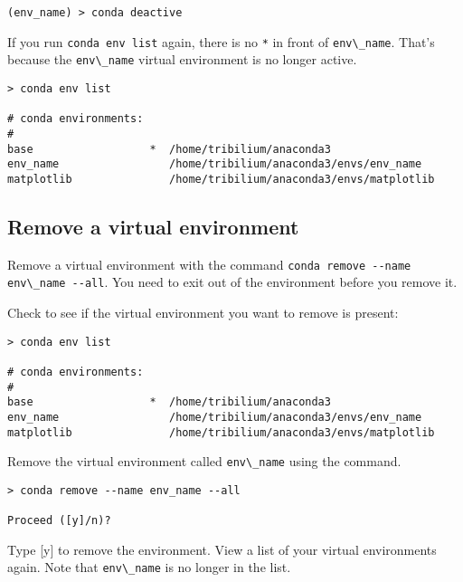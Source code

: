 \documentclass{book}
\newcommand{\passthrough}[1]{#1}
\begin{document}
\begin{lstlisting}
(env_name) > conda deactive
\end{lstlisting}

If you run \passthrough{\lstinline!conda env list!} again, there is no
\passthrough{\lstinline!*!} in front of
\passthrough{\lstinline!env\_name!}. That's because the
\passthrough{\lstinline!env\_name!} virtual environment is no longer
active.

\begin{lstlisting}
> conda env list

# conda environments:
#
base                  *  /home/tribilium/anaconda3
env_name                 /home/tribilium/anaconda3/envs/env_name
matplotlib               /home/tribilium/anaconda3/envs/matplotlib
\end{lstlisting}
    




    
        \hypertarget{remove-a-virtual-environment}{%
\subsection{Remove a virtual
environment}\label{remove-a-virtual-environment}}

Remove a virtual environment with the command
\passthrough{\lstinline!conda remove --name env\_name --all!}. You need
to exit out of the environment before you remove it.

Check to see if the virtual environment you want to remove is present:

\begin{lstlisting}
> conda env list

# conda environments:
#
base                  *  /home/tribilium/anaconda3
env_name                 /home/tribilium/anaconda3/envs/env_name
matplotlib               /home/tribilium/anaconda3/envs/matplotlib
\end{lstlisting}

Remove the virtual environment called
\passthrough{\lstinline!env\_name!} using the command.

\begin{lstlisting}
> conda remove --name env_name --all

Proceed ([y]/n)?
\end{lstlisting}

Type {[}y{]} to remove the environment. View a list of your virtual
environments again. Note that \passthrough{\lstinline!env\_name!} is no
longer in the list.
\end{document}
